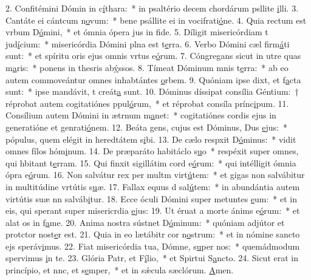2. Confitémini Dómin in c\uline{í}thara:~* in psaltério decem chordárum psllite \uline{i}lli.
3. Cantáte ei cántcum n\uline{o}vum:~* bene psállite ei in vocifrati\uline{ó}ne.
4. Quia rectum est vrbum D\uline{ó}mini,~* et ómnia ópera jus in f\uline{i}de.
5. Díligit misericórdiam t jud\uline{í}cium:~* misericórdia Dómini plna est t\uline{e}rra.
6. Verbo Dómini cæl firm\uline{á}ti sunt:~* et spíritu oris ejus omnis vrtus e\uline{ó}rum.
7. Cóngregans sicut in utre quas m\uline{a}ris:~* ponens in thesris ab\uline{ý}ssos.
8. Tímeat Dóminum mnis t\uline{e}rra:~* ab eo autem commoveántur omnes inhabtántes \uline{o}rbem.
9. Quóniam ipse dixt, et f\uline{a}cta sunt:~* ipse mandávit, t creát\uline{a} sunt.
10. Dóminus díssipat consília Géntium:~† réprobat autem cogitatiónes ppul\uline{ó}rum,~* et réprobat consíla prínc\uline{i}pum.
11. Consílium autem Dómini in ætrnum m\uline{a}net:~* cogitatiónes cordis ejus in generatióne et genrati\uline{ó}nem.
12. Beáta gens, cujus est Dóminus, Dus \uline{e}jus:~* pópulus, quem elégit in heredtátem s\uline{i}bi.
13. De cælo respxit D\uline{ó}minus:~* vidit omnes fílos hóm\uline{i}num.
14. De præparáto habitáclo s\uline{u}o~* respéxit super omnes, qui hbitant t\uline{e}rram.
15. Qui finxit sigillátim cord e\uline{ó}rum:~* qui intélligit ómnia ópra e\uline{ó}rum.
16. Non salvátur rex per multm virt\uline{ú}tem:~* et gigas non salvábitur in multitúdine vrtútis s\uline{u}æ.
17. Fallax equus d sal\uline{ú}tem:~* in abundántia autem virtútis suæ nn salváb\uline{i}tur.
18. Ecce óculi Dómini super metuntes \uline{e}um:~* et in eis, qui sperant super misericrdia \uline{e}jus:
19. Ut éruat a morte ánims e\uline{ó}rum:~* et alat os in f\uline{a}me.
20. Anima nostra sústnet D\uline{ó}minum:~* quóniam adjútor et protctor nost\uline{e}r est.
21. Quia in eo lætábitr cor n\uline{o}strum:~* et in nómine sancto ejs speráv\uline{i}mus.
22. Fiat misericórdia tua, Dómne, s\uline{u}per nos:~* quemádmodum spervimus \uline{i}n te.
23. Glória Patr, et F\uline{í}lio,~* et Spirtui S\uline{a}ncto.
24. Sicut erat in princípio, et nnc, et s\uline{e}mper,~* et in sǽcula sæclórum. \uline{A}men.
